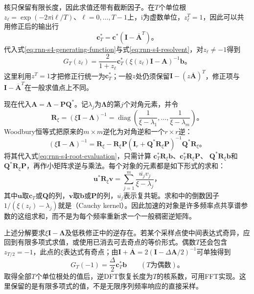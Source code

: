 核只保留有限长度，因此求值还带有截断因子。在$T$个单位根
$z_\ell=\exp(-2\pi\mathrm i\ell/T)$、$\ell=0,\ldots,T-1$上，$\mathrm i$为虚数单位，$z_\ell^T=1$，因此可以共用修正后的输出行
\begin{equation}
  \bm c_T^*=\bm c^*(\bm I-\overline{\bm A}^{T})\text{。}
  \label{eq:rnn-s4-finite-readout}
\end{equation}
代入式\eqref{eq:rnn-s4-generating-function}与式\eqref{eq:rnn-s4-resolvent}，对$z_\ell\neq-1$得到
\begin{equation}
  G_T(z_\ell)=\frac{2}{1+z_\ell}
    \bm c_T^*(\xi(z_\ell)\bm I-\bm A)^{-1}\bm b\text{。}
  \label{eq:rnn-s4-root-evaluation}
\end{equation}
这里利用$z^T=1$才把修正行统一为$\bm c_T^*$；一般$z$处仍须保留$\bm I-(z\overline{\bm A})^T$，修正项与$\bm I-\overline{\bm A}^T$在一般求值点上不同。

现在代入$\bm A=\bm\Lambda-\bm P\bm Q^*$。记$\lambda_j$为$\bm\Lambda$的第$j$个对角元素，并令
\[
  \bm R_\xi=(\xi\bm I-\bm\Lambda)^{-1}
    =\operatorname{diag}\!\left(
       \frac1{\xi-\lambda_1},\ldots,\frac1{\xi-\lambda_m}\right)\text{。}
\]
Woodbury恒等式把原来的$m\times m$逆化为对角逆和一个$r\times r$逆：
\begin{equation}
  (\xi\bm I-\bm A)^{-1}
    =\bm R_\xi-\bm R_\xi\bm P
       (\bm I_r+\bm Q^*\bm R_\xi\bm P)^{-1}
       \bm Q^*\bm R_\xi\text{。}
  \label{eq:rnn-s4-woodbury}
\end{equation}
将其代入式\eqref{eq:rnn-s4-root-evaluation}，只需计算
$\bm c_T^*\bm R_\xi\bm b$、$\bm c_T^*\bm R_\xi\bm P$、
$\bm Q^*\bm R_\xi\bm b$和$\bm Q^*\bm R_\xi\bm P$，再作小矩阵求逆与乘法。每个对象的元素都是如下形式的求和：
\begin{equation}
  \bm u^*\bm R_\xi\bm v
    =\sum_{j=1}^{m}\frac{\overline{u_j}v_j}{\xi-\lambda_j}\text{，}
  \label{eq:rnn-s4-cauchy-sum}
\end{equation}
其中$\bm u$取$\bm c_T$或$\bm Q$的列，$\bm v$取$\bm b$或$\bm P$的列，$\overline{u_j}$表示复共轭。求和中的倒数因子$1/(\xi(z_\ell)-\lambda_j)$就是（Cauchy kernel）。因此加速的对象是许多频率点共享谱参数的这组求和，而不是为每个频率重新求一个一般稠密逆矩阵。

上述分解要求$\xi\bm I-\bm\Lambda$及低秩修正中的逆存在。若某个采样点使中间表达式奇异，应回到有限多项式求值，或使用已消去可去奇点的等价形式。偶数$T$还会包含$z_{T/2}=-1$，此点的$\xi$表达式有奇点；由$\bm I+\overline{\bm A}=2(\bm I-\Delta\bm A/2)^{-1}$可单独得到
\[
  G_T(-1)=\frac{\Delta}{2}\bm c_T^*\bm b
  \qquad(T\text{为偶数})\text{。}
\]
取得全部$T$个单位根处的值后，逆DFT恢复长度为$T$的核系数，可用FFT实现。这里保留的是有限多项式的值，不是无限序列频率响应的直接采样。

